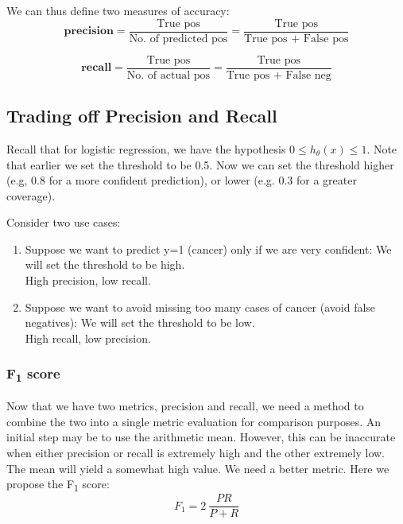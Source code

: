         We can thus define two measures of accuracy:
        \begin{equation}
            \mathbf{precision} = \frac{\text{True pos}}{\text{No. of predicted pos}} = \frac{\text{True pos}}{\text{True pos + False pos}}
            \label{eq:precision}
        \end{equation}

        \begin{equation}
            \mathbf{recall} = \frac{\text{True pos}}{\text{No. of actual pos}} = \frac{\text{True pos}}{\text{True pos + False neg}}
            \label{eq:recall}
        \end{equation}


\subsection{Trading off Precision and Recall}
Recall that for logistic regression, we have the hypothesis $0 \leq h_\theta(x) \leq 1$. Note that earlier we set the threshold to be 0.5. Now we can set the threshold higher (e.g, 0.8 for a more confident prediction), or lower (e.g. 0.3 for a greater coverage).\\ 
    \par Consider two use cases:
    \begin{enumerate}
        \item Suppose we want to predict y=1 (cancer) only if we are very confident: We will set the threshold to be high.\\
            High precision, low recall.
        \item Suppose we want to avoid missing too many cases of cancer (avoid false negatives): We will set the threshold to be low.\\
            High recall, low precision.
    \end{enumerate}

    \subsubsection{F\textsubscript{1} score}
        Now that we have two metrics, precision and recall, we need a method to combine the two into a single metric evaluation for comparison purposes. An initial step may be to use the arithmetic mean. However, this can be inaccurate when either precision or recall is extremely high and the other extremely low. The mean will yield a somewhat high value. We need a better metric. Here we propose the F\textsubscript{1} score:
        \begin{equation}
            F_1 = 2 \: \frac{PR}{P+R}
            \label{eq:f1-score}
        \end{equation}
